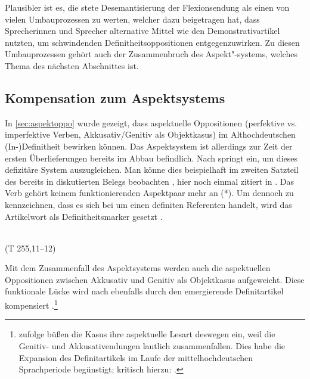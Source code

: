 Plausibler ist es, die stete Desemantisierung der Flexionsendung als einen von vielen Umbauprozessen zu werten, welcher dazu beigetragen hat, dass Sprecherinnen und Sprecher alternative Mittel wie den Demonstrativartikel nutzten, um schwindenden Definitheitsoppositionen entgegenzuwirken. Zu diesen Umbauprozessen gehört auch der Zusammenbruch des Aspekt"-systems, welches Thema des nächsten Abschnittes ist.

\subsection{Kompensation zum Aspektsystems} \label{aspekt}

In \ref{sec:aspektoppo} wurde gezeigt, dass aspektuelle Oppositionen (perfektive vs. imperfektive Verben, Akkusativ/Genitiv als Objektkasus) im Althochdeutschen (In-)De\-fi\-nit\-heit bewirken können. Das Aspektsystem ist allerdings zur Zeit der ersten Überlieferungen bereits im Abbau befindlich. Nach  \textcite{Leiss1994,Leiss2000,Leiss2010} springt  ein, um dieses defizitäre System auszugleichen. Man könne dies beispielhaft im zweiten Satzteil des bereits in  diskutierten Belegs beobachten \parencite[180f.]{Leiss2000}, hier noch einmal zitiert in . Das Verb  gehört keinem funktionierenden Aspektpaar mehr an (*). Um dennoch zu kennzeichnen, dass es sich bei  um einen definiten Referenten handelt, wird das Artikelwort  als Definitheitsmarker gesetzt \parencite[181]{Leiss2000}.


\begin{exe}
	\ex \label{ex:bilan}   \\   (T 255,11--12)
\end{exe}
\noindent
Mit dem Zusammenfall des Aspektsystems werden auch die aspektuellen Oppositionen zwischen Akkusativ und Genitiv als Objektkasus aufgeweicht. Diese funktionale Lücke wird nach \textcite[187ff.]{Leiss2000} ebenfalls durch den emergierende Definitartikel kompensiert \parencite[vgl. auch][46f.]{Abraham1997}.\footnote{\textcite[88f.]{Philippi1997} zufolge büßen die Kasus ihre aspektuelle Lesart deswegen ein, weil die Genitiv- und Akkusativendungen lautlich zusammenfallen. Dies habe die Expansion des Definitartikels im Laufe der mittelhochdeutschen Sprachperiode begünstigt; kritisch hierzu: \textcite[234f.]{Lyons1999}.}


